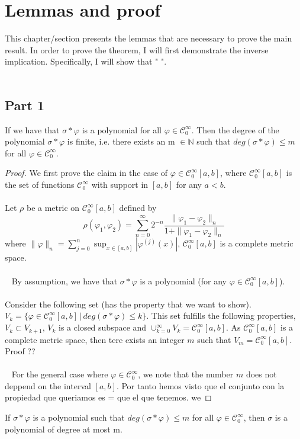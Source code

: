 \documentclass[../main.tex]{subfiles}
\begin{document}
	\chapter{Lemmas and proof} \label{ch:proof}
	This chapter/section presents the lemmas that are necessary to prove the main result.	In order to prove the theorem, I will first demonstrate the inverse implication. Specifically, I will show that "  ". \\ \\ 
	\section{Part 1}
	\begin{lema}  %
		If we have that $\sigma \ast \varphi $ is a polynomial for all $\varphi \in \mathcal{C}^\infty_0 $.  Then the degree of the polynomial $\sigma \ast \varphi $ is finite, i.e. there exists an m $\in \mathbb{N}$ such that $ deg (\sigma \ast \varphi) \leq m$ for all $\varphi \in \mathcal{C}^\infty_0$. 
	\end{lema}
	
	\begin{proof}
		We first prove the claim in the case of $\varphi \in \mathcal{C}^\infty_0[a,b]$, where $\mathcal{C}^\infty_0[a,b]$ is the set of functions $\mathcal{C}^\infty_0$ with support in $[a,b]$ for any $a<b$. \\ \\ Let $\rho$ be a metric on $\mathcal{C}^\infty_0[a,b]$ defined by
		$$\rho(\varphi_1,\varphi_2) = \sum_{n=0}^\infty 2^{-n}  \frac{\|\varphi_1 -\varphi_2\|_n}{1+\|\varphi_1 -\varphi_2\|_n}$$ where $\|\varphi\|_n= \sum_{j=0}^n \sup_{x\in [a,b]} | \varphi^{(j)}(x)| $,  $\mathcal{C}^\infty_0[a,b]$  is a complete metric space. \\ \\ 
		By assumption, we have that $\sigma \ast \varphi$ is a polynomial (for any $\varphi \in \mathcal{C}^\infty_0[a,b]$). \\ \\  Consider the following set (has the property that we want to show). \\ $V_k= \{\varphi \in \mathcal{C}_0^\infty[a,b] \, | \,  deg(\sigma \ast \varphi ) \leq k\}$. This set fulfills the following properties, $V_k \subset V_{k+1}$, $V_k $ is a closed subspace and $\cup_{k=0}^\infty V_k = \mathcal{C}_0^\infty[a,b]$. As $\mathcal{C}_0^\infty[a,b]$ is a complete metric space, then tere exists an integer $m$ such that $V_m=\mathcal{C}_0^\infty[a,b]$. Proof ??\\ \\ 
		For the general case where $\varphi \in \mathcal{C}_0^\infty$, we note that the number $m$ does not deppend on the interval $[a,b]$.  Por tanto hemos visto que el conjunto con la propiedad que queriamos es = que el que tenemos. we

	\end{proof}
	\begin{lema} %
		If $\sigma \ast \varphi$ is a polynomial such that $ deg (\sigma \ast \varphi) \leq m$ for all $\varphi \in \mathcal{C}^\infty_0$, then $\sigma$ is a polynomial of degree at most m.
	\end{lema}
	
\end{document}
